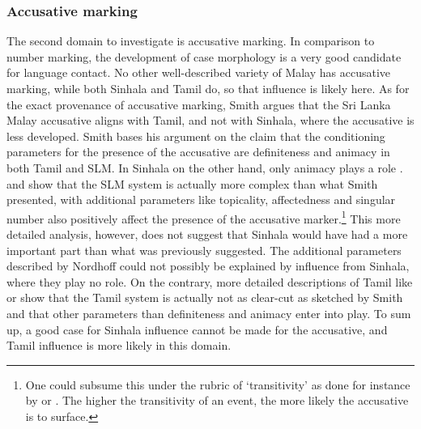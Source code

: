 \documentclass[a4paper,10pt]{article}
\newcommand{\D}{\dz}
\newcommand{\T}{\tz}
\newcommand{\NN}{\textipa{\textsubbar{n}}}
\begin{document}
\subsubsection{Accusative marking}
The second domain to investigate is accusative marking. 
In comparison to number marking, the development of case morphology is a very good candidate for language contact. No other well-described variety of Malay has accusative marking, while both Sinhala and Tamil do, so that influence is likely here. As for the exact provenance of accusative marking, Smith argues that the Sri Lanka Malay accusative aligns with Tamil, and not with Sinhala, where the accusative is less developed. Smith bases his argument on the claim  that the conditioning parameters for the presence of the accusative  are definiteness and animacy in both Tamil and SLM. In Sinhala on the other hand, only animacy plays a role \citep[also cf.][780,790]{Gair2003}. \citet{Ansaldo2008genesis} and \citet[329-332]{Nordhoff2009phd} show that the SLM system is actually more complex than what Smith presented, with additional parameters like topicality, affectedness and singular number also positively affect the presence of the accusative marker.\footnote{One
 could subsume this under the rubric of `transitivity' as done for instance by \citet{HopperEtAl1980} or \citet{Naess2007}. The higher the transitivity of an event, the more likely the accusative is to surface.
}
This more detailed analysis, however, does not suggest that Sinhala would have had a more important part than what was previously suggested. The additional parameters described by Nordhoff could not possibly be explained by influence from Sinhala, where they play no role. On the contrary, more detailed descriptions of Tamil like  \citet[107]{Asher1985} or \citet[29]{Lehmann1989tamil} show that the Tamil system is actually not as clear-cut as sketched by Smith and that other parameters than definiteness and animacy enter into play. To sum up, a good case for Sinhala influence cannot be made for the accusative, and Tamil influence is more likely in this domain.


% 
 
\end{document}
